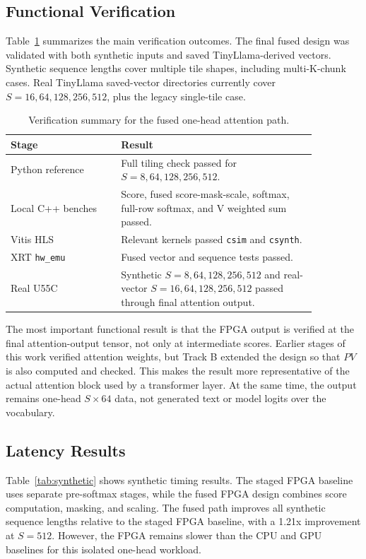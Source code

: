 \documentclass[conference]{IMSTemplate}
\begin{document}
\subsection{Functional Verification}

Table~\ref{tab:verification} summarizes the main verification outcomes. The
final fused design was validated with both synthetic inputs and saved
TinyLlama-derived vectors. Synthetic sequence lengths cover multiple tile
shapes, including multi-K-chunk cases. Real TinyLlama saved-vector directories
currently cover \(S=16,64,128,256,512\), plus the legacy single-tile case.

\begin{table}[t]
\centering
\caption{Verification summary for the fused one-head attention path.}
\label{tab:verification}
\begin{tabular}{p{0.31\linewidth}p{0.55\linewidth}}
\toprule
Stage & Result \\
\midrule
Python reference & Full tiling check passed for \(S=8,64,128,256,512\). \\
Local C++ benches & Score, fused score-mask-scale, softmax, full-row softmax,
and V weighted sum passed. \\
Vitis HLS & Relevant kernels passed \texttt{csim} and \texttt{csynth}. \\
XRT \texttt{hw\_emu} & Fused vector and sequence tests passed. \\
Real U55C & Synthetic \(S=8,64,128,256,512\) and real-vector
\(S=16,64,128,256,512\) passed through final attention output. \\
\bottomrule
\end{tabular}
\end{table}

The most important functional result is that the FPGA output is verified at the
final attention-output tensor, not only at intermediate scores. Earlier stages
of this work verified attention weights, but Track B extended the design so
that \(PV\) is also computed and checked. This makes the result
more representative of the actual attention block used by a transformer layer.
At the same time, the output remains one-head \(S\times64\) data, not generated
text or model logits over the vocabulary.

\subsection{Latency Results}

Table~\ref{tab:synthetic} shows synthetic timing results. The staged FPGA
baseline uses separate pre-softmax stages, while the fused FPGA design combines
score computation, masking, and scaling. The fused path improves all synthetic
sequence lengths relative to the staged FPGA baseline, with a 1.21x improvement
at \(S=512\). However, the FPGA remains slower than the CPU and GPU baselines
for this isolated one-head workload.
\end{document}

